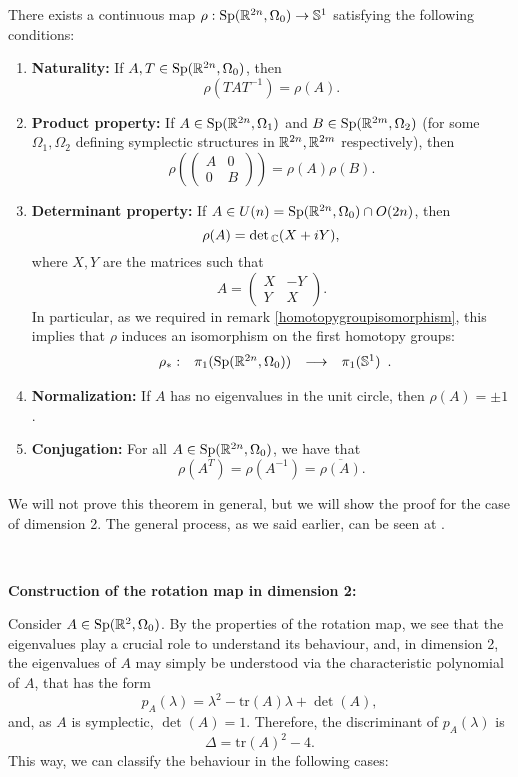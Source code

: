 \begin{theo}
There exists a continuous map $\rho : \mathrm{Sp}(\mathbb{R}^{2n},\Omega_0) \rightarrow \mathbb{S}^1$ satisfying the following conditions:
\begin{enumerate}
	\item {\bf Naturality:} If $A,T \in \mathrm{Sp}(\mathbb{R}^{2n},\Omega_0)$, then
	\[\rho(TAT^{-1}) = \rho(A) .\]
	\item {\bf Product property:} If $A \in \mathrm{Sp}(\mathbb{R}^{2n},\Omega_1)$ and $B \in \mathrm{Sp}(\mathbb{R}^{2m},\Omega_2)$ (for some $\Omega_1, \Omega_2$ defining symplectic structures in $\mathbb{R}^{2n}, \mathbb{R}^{2m}$ respectively), then
	\[\rho\left(\begin{pmatrix}A & 0 \\ 0 & B\end{pmatrix}\right) = \rho(A) \rho(B) .\]
	\item {\bf Determinant property:} If $A \in U(n) = \mathrm{Sp}(\mathbb{R}^ {2n},\Omega_0) \cap O(2n)$, then
	\[\rho(A) = \det{}_{\mathbb{C}}(X+iY),\]
	where $X,Y$ are the matrices such that
	\[A = \begin{pmatrix} X & -Y \\ Y & X \end{pmatrix}.\]
	In particular, as we required in remark \ref{homotopygroupisomorphism}, this implies that $\rho$ induces an isomorphism on the first homotopy groups:
	\[\begin{array}{rccc} \rho_{\ast} : & \pi_1(\mathrm{Sp}(\mathbb{R}^{2n},\Omega_0)) & \longrightarrow & \pi_1(\mathbb{S}^1) \end{array} .\]
	\item {\bf Normalization:} If $A$ has no eigenvalues in the unit circle, then $\rho(A) = \pm 1$.
	\item {\bf Conjugation:} For all $A \in \mathrm{Sp}(\mathbb{R}^{2n},\Omega_0)$, we have that
	\[\rho(A^T) = \rho(A^{-1}) = \overline{\rho(A)} .\]
\end{enumerate}

\end{theo}

We will not prove this theorem in general, but we will show the proof for the case of dimension 2. The general process, as we said earlier, can be seen at \cite{gutt2012conley}.

\

{\bf Construction of the rotation map in dimension 2:}

Consider $A \in \mathrm{Sp}(\mathbb{R}^2,\Omega_0)$. By the properties of the rotation map, we see that the eigenvalues play a crucial role to understand its behaviour, and, in dimension 2, the eigenvalues of $A$ may simply be understood via the characteristic polynomial of $A$, that has the form
\[p_A(\lambda) = \lambda^2 - \text{tr}(A) \lambda + \det(A) ,\]
and, as $A$ is symplectic, $\det(A) = 1$. Therefore, the discriminant of $p_A(\lambda)$ is
\[\Delta = \text{tr}(A)^2 - 4 .\]
This way, we can classify the behaviour in the following cases:

